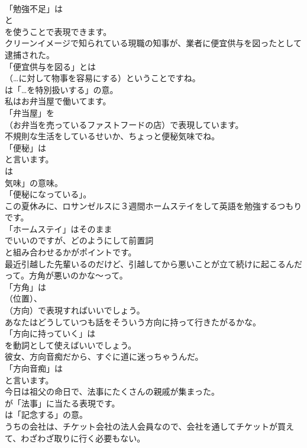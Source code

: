 \documentclass[8pt]{extreport}
\begin{document}
\begin{CJK}{UTF8}{min}
\\	「勉強不足」は
\\	と
\\	を使うことで表現できます。	
\\	クリーンイメージで知られている現職の知事が、業者に便宜供与を図ったとして逮捕された。 
\\	「便宜供与を図る」とは 
\\	（…に対して物事を容易にする）ということですね。
\\	は「…を特別扱いする」の意。	
\\	私はお弁当屋で働いてます。 
\\	「弁当屋」を 
\\	（お弁当を売っているファストフードの店）で表現しています。	
\\	不規則な生活をしているせいか、ちょっと便秘気味でね。 
\\	「便秘」は
\\	と言います。
\\	は
\\	気味」の意味。
\\	「便秘になっている」。	
\\	この夏休みに、ロサンゼルスに３週間ホームステイをして英語を勉強するつもりです。 
\\	「ホームステイ」はそのまま
\\	でいいのですが、どのようにして前置詞
\\	と組み合わせるかがポイントです。	
\\	最近引越した先輩いるのだけど、引越してから悪いことが立て続けに起こるんだって。方角が悪いのかな～って。 
\\	「方角」は 
\\	（位置）、
\\	（方向）で表現すればいいでしょう。	
\\	あなたはどうしていつも話をそういう方向に持って行きたがるかな。 
\\	「方向に持っていく」は
\\	を動詞として使えばいいでしょう。	
\\	彼女、方向音痴だから、すぐに道に迷っちゃうんだ。 
\\	「方向音痴」は
\\	と言います。	
\\	今日は祖父の命日で、法事にたくさんの親戚が集まった。 
\\	が「法事」に当たる表現です。
\\	は「記念する」の意。	
\\	うちの会社は、チケット会社の法人会員なので、会社を通してチケットが買えて、わざわざ取りに行く必要もない。 

\end{CJK}
\end{document}
